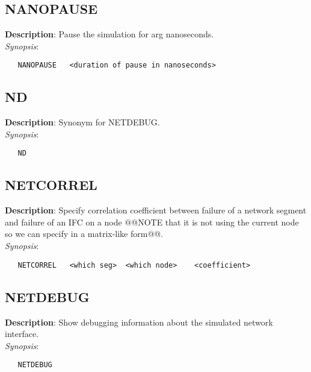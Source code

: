 \subsection{\bf NANOPAUSE}
\label{manpages:NANOPAUSE}
\label{manpages:nanopause}
\vspace{-0.2in}
{\bf Description}: 	Pause the simulation for arg nanoseconds.\\[1.5ex]
{\em Synopsis}:
\vspace{-0.2in}
\scriptsize
\begin{verbatim}
   NANOPAUSE   <duration of pause in nanoseconds>		
\end{verbatim}
\normalsize
\vspace{-0.2in}


\subsection{\bf ND}
\label{manpages:ND}
\label{manpages:nd}
\vspace{-0.2in}
{\bf Description}: 	Synonym for NETDEBUG.\\[1.5ex]
{\em Synopsis}:
\vspace{-0.2in}
\scriptsize
\begin{verbatim}
   ND   						
\end{verbatim}
\normalsize
\vspace{-0.2in}


\subsection{\bf NETCORREL}
\label{manpages:NETCORREL}
\label{manpages:netcorrel}
\vspace{-0.2in}
{\bf Description}: 	Specify correlation coefficient between failure of a network segment and failure of an IFC on a node @@NOTE that it is not using the current node so we can specify in a matrix-like form@@.\\[1.5ex]
{\em Synopsis}:
\vspace{-0.2in}
\scriptsize
\begin{verbatim}
   NETCORREL   <which seg>	<which node>	<coefficient>	
\end{verbatim}
\normalsize
\vspace{-0.2in}


\subsection{\bf NETDEBUG}
\label{manpages:NETDEBUG}
\label{manpages:netdebug}
\vspace{-0.2in}
{\bf Description}: 	Show debugging information about the simulated network interface.\\[1.5ex]
{\em Synopsis}:
\vspace{-0.2in}
\scriptsize
\begin{verbatim}
   NETDEBUG   	
\end{verbatim}
\normalsize
\vspace{-0.2in}


